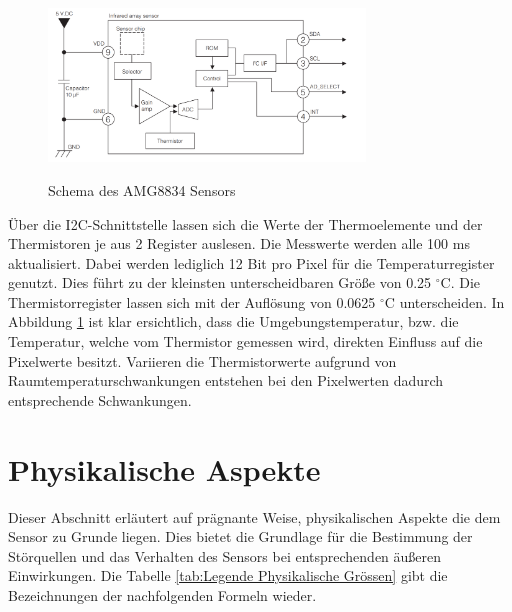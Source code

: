 \begin{figure}[H]
	\centering
	\includegraphics[width=0.75\textwidth]
	{fig/Circuit_AMG8834.PNG}
	\caption[Schema des AMG8834 Sensors]{Schema des AMG8834 Sensors} \protect\cite{AMG8834}
	\label{fig:SchemaAMG8834}
\end{figure}
 
Über die \ac{I2C}-Schnittstelle lassen sich die Werte der Thermoelemente und der Thermistoren je aus 2 Register auslesen. Die Messwerte werden alle 100 ms aktualisiert. Dabei werden lediglich 12 Bit pro Pixel für die Temperaturregister genutzt. Dies führt zu der kleinsten unterscheidbaren Größe von 0.25 $^\circ$C. Die Thermistorregister lassen sich mit der Auflösung von 0.0625 $^\circ$C unterscheiden. In Abbildung \ref{fig:SchemaAMG8834} ist klar ersichtlich, dass die Umgebungstemperatur, bzw. die Temperatur, welche vom Thermistor gemessen wird, direkten Einfluss auf die Pixelwerte besitzt. Variieren die Thermistorwerte aufgrund von Raumtemperaturschwankungen entstehen bei den Pixelwerten dadurch entsprechende Schwankungen.

\section{Physikalische Aspekte}
\label{sec:Physik}
Dieser Abschnitt erläutert auf prägnante Weise, physikalischen Aspekte die dem Sensor zu Grunde liegen. Dies bietet die Grundlage für die Bestimmung der Störquellen und das Verhalten des Sensors bei entsprechenden äußeren Einwirkungen. Die Tabelle \ref{tab:Legende Physikalische Grössen} gibt die Bezeichnungen der nachfolgenden Formeln wieder.

